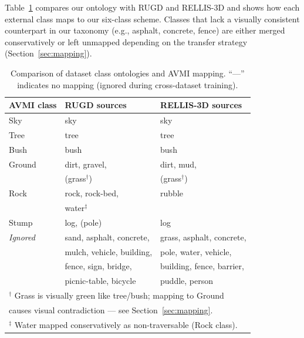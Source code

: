 Table~\ref{tab:ontology} compares our ontology with RUGD and RELLIS-3D and
shows how each external class maps to our six-class scheme.  Classes that
lack a visually consistent counterpart in our taxonomy (e.g., asphalt,
concrete, fence) are either merged conservatively or left unmapped depending
on the transfer strategy (Section~\ref{sec:mapping}).

\begin{table}[h]
\centering
\caption{Comparison of dataset class ontologies and AVMI mapping.
         ``---'' indicates no mapping (ignored during cross-dataset training).}
\label{tab:ontology}
\renewcommand{\arraystretch}{1.15}
\begin{tabular}{p{2cm}p{2.2cm}p{2.2cm}}
\toprule
\textbf{AVMI class} & \textbf{RUGD sources} & \textbf{RELLIS-3D sources} \\
\midrule
Sky      & sky                   & sky                \\
Tree     & tree                  & tree               \\
Bush     & bush                  & bush               \\
Ground   & dirt, gravel,         & dirt, mud,         \\
         & (grass$^\dagger$)     & (grass$^\dagger$)  \\
Rock     & rock, rock-bed,       & rubble             \\
         & water$^\ddagger$      &                    \\
Stump    & log, (pole)           & log                \\
\midrule
\textit{Ignored} & sand, asphalt, concrete, & grass, asphalt, concrete, \\
         & mulch, vehicle, building, & pole, water, vehicle, \\
         & fence, sign, bridge,  & building, fence, barrier, \\
         & picnic-table, bicycle & puddle, person     \\
\bottomrule
\multicolumn{3}{l}{\small $^\dagger$ Grass is visually green like tree/bush; mapping to Ground}\\
\multicolumn{3}{l}{\small causes visual contradiction --- see Section~\ref{sec:mapping}.}\\
\multicolumn{3}{l}{\small $^\ddagger$ Water mapped conservatively as non-traversable (Rock class).}
\end{tabular}
\end{table}

